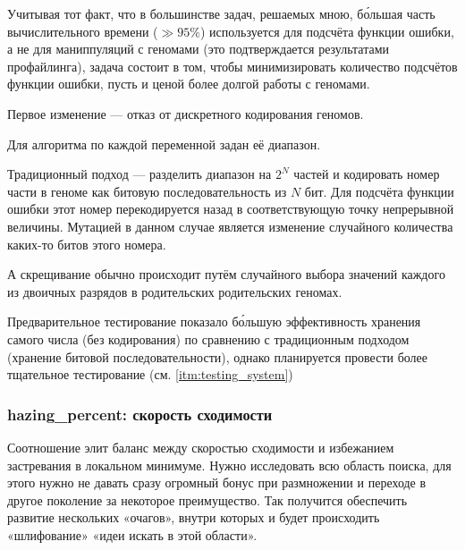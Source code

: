 Учитывая тот факт, что в большинстве задач, решаемых мною, бо́льшая часть вычислительного времени ($\gg 95\%$) используется для подсчёта функции ошибки, а не для маниппуляций с геномами
(это подтверждается результатами профайлинга),
задача состоит в том, чтобы минимизировать количество подсчётов функции ошибки, пусть и ценой более долгой работы с геномами.

Первое изменение — отказ от дискретного кодирования геномов.

Для алгоритма по каждой переменной задан её диапазон.

Традиционный подход — разделить диапазон на $2^N$ частей и кодировать номер части в геноме как битовую последовательность из $N$ бит.
Для подсчёта функции ошибки этот номер перекодируется назад в соответствующую точку непрерывной величины.
Мутацией в данном случае является изменение случайного количества каких-то битов этого номера.

А скрещивание обычно происходит путём случайного выбора значений каждого из двоичных разрядов в родительских
родительских геномах.

Предварительное тестирование показало бо́льшую эффективность хранения самого числа (без кодирования) по сравнению с традиционным подходом (хранение битовой последовательности), однако планируется провести более тщательное тестирование (см. \ref{itm:testing_system})

\subsubsection{hazing\_percent: скорость сходимости}\label{subsubsec:hazing}
Соотношение элит
баланс между скоростью сходимости и избежанием застревания в локальном минимуме.
Нужно исследовать всю область поиска, для этого нужно не давать сразу огромный бонус при размножении и переходе в другое поколение за некоторое преимущество.
Так получится обеспечить развитие нескольких «очагов», внутри которых и будет происходить «шлифование» «идеи искать в этой области».
